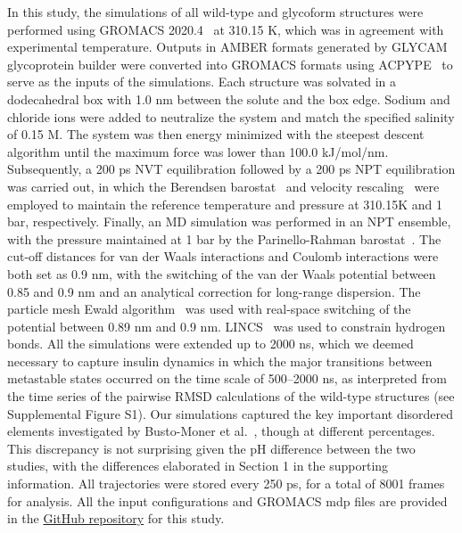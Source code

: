 \documentclass[sn-vancouver]{sn-jnl}
\begin{document}
In this study, the simulations of all wild-type and glycoform structures were performed using GROMACS 2020.4~\cite{abraham2015gromacs, pall2014tackling} at 310.15 K, which was in agreement with experimental temperature. Outputs in AMBER formats generated by GLYCAM glycoprotein builder were converted into GROMACS formats using ACPYPE~\cite{da2012acpype} to serve as the inputs of the simulations. Each structure was solvated in a dodecahedral box with 1.0 nm between the solute and the box edge. Sodium and chloride ions were added to neutralize the system and match the specified salinity of 0.15 M. The system was then energy minimized with the steepest descent algorithm until the maximum force was lower than 100.0 kJ/mol/nm. Subsequently, a 200 ps NVT equilibration followed by a 200 ps NPT equilibration was carried out, in which the Berendsen barostat~\cite{berendsen1984molecular} and velocity rescaling~\cite{bussi2007canonical} were employed to maintain the reference temperature and pressure at 310.15K and 1 bar, respectively. Finally, an MD simulation was performed in an NPT ensemble, with the pressure maintained at 1 bar by the Parinello-Rahman barostat~\cite{parrinello1980crystal, parrinello1981polymorphic}. The cut-off distances for van der Waals interactions and Coulomb interactions were both set as 0.9 nm, with the switching of the van der Waals potential between 0.85 and 0.9 nm and an analytical correction for long-range dispersion. The particle mesh Ewald algorithm~\cite{essmann1995smooth} was used with real-space switching of the potential between 0.89 nm and 0.9 nm. LINCS~\cite{lincs} was used to constrain hydrogen bonds. All the simulations were extended up to 2000 ns, which we deemed necessary to capture insulin dynamics in which the major transitions between metastable states occurred on the time scale of 500--2000 ns, as interpreted from the time series of the pairwise RMSD calculations of the wild-type structures (see Supplemental Figure S1).  Our simulations captured the key important disordered elements investigated by Busto-Moner et al.~\cite{busto2021structural},  though at different percentages. This discrepancy is not surprising given the pH difference between the two studies, with the differences elaborated in Section 1 in the supporting information.  All trajectories were stored every 250 ps, for a total of 8001 frames for analysis. All the input configurations and GROMACS mdp files are provided in the \href{https://github.com/shirtsgroup/Glycoinsulin_project}{GitHub repository} for this study.
\end{document}

